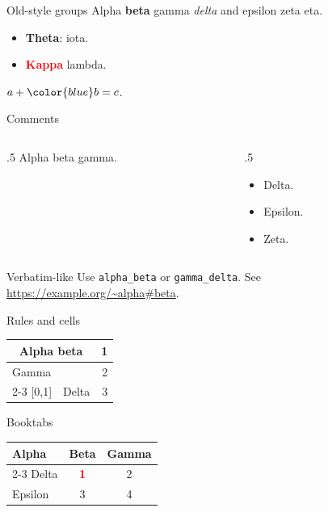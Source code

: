 \documentclass{beamer}
\begin{document}
\begin{frame}{Old-style groups}
Alpha {\bf beta} gamma {\em delta} and {\small epsilon
  zeta} eta.
\begin{itemize}
  \item {\bf Theta}: iota.
  \item \textcolor{red}{\bf Kappa} lambda.
\end{itemize}
$a + {\color{blue} b} = c$.
\end{frame}

\begin{frame}{Comments}
\begin{columns}%
\begin{column}{.5\textwidth}%
Alpha beta%
gamma. %
\end{column}%
\begin{column}{.5\textwidth}
\begin{itemize}
  \item Delta. %
  \item Epsilon.
  \item Zeta.
\end{itemize}
\end{column}
\end{columns}
\end{frame}

\begin{frame}[fragile]{Verbatim-like}
Use \verb|alpha_beta| or \texttt{gamma\_delta}.
See \url{https://example.org/~alpha#beta}.
\end{frame}

\begin{frame}{Rules and cells}
\begin{tabular}{|l|c|r|}
\hline
\multicolumn{2}{|c|}{Alpha beta} & 1\\
\hline
Gamma & & 2\\[2pt]
\cline{2-3}
{[0,1]} & Delta & 3\\
\hline
\end{tabular}
\end{frame}

\begin{frame}{Booktabs}
{\small
\begin{tabular}{lcc}
\toprule
Alpha & Beta & Gamma\\
\cmidrule(lr){2-3}
Delta & \textcolor{red}{\bf 1} & 2\\
\midrule
Epsilon & 3 & 4\\
\bottomrule
\end{tabular}}
\end{frame}
\end{document}
